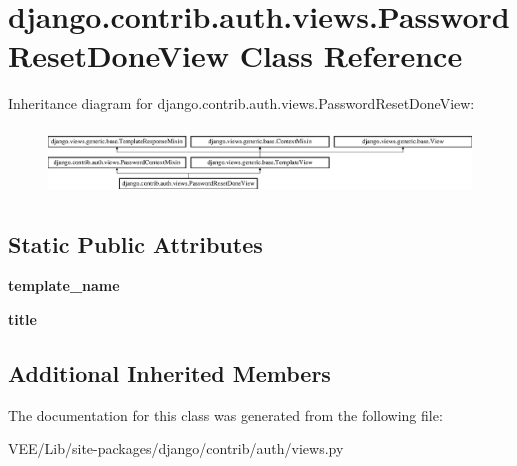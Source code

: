 \hypertarget{classdjango_1_1contrib_1_1auth_1_1views_1_1_password_reset_done_view}{}\section{django.\+contrib.\+auth.\+views.\+Password\+Reset\+Done\+View Class Reference}
\label{classdjango_1_1contrib_1_1auth_1_1views_1_1_password_reset_done_view}
Inheritance diagram for django.\+contrib.\+auth.\+views.\+Password\+Reset\+Done\+View\+:\begin{figure}[H]
\begin{center}
\leavevmode
\includegraphics[height=1.789137cm]{classdjango_1_1contrib_1_1auth_1_1views_1_1_password_reset_done_view}
\end{center}
\end{figure}
\subsection*{Static Public Attributes}
\begin{DoxyCompactItemize}
\item 
\mbox{\label{classdjango_1_1contrib_1_1auth_1_1views_1_1_password_reset_done_view_a618f8aef1158b35aa21ac0595d44d879}} 
{\bfseries template\+\_\+name}
\item 
\mbox{\label{classdjango_1_1contrib_1_1auth_1_1views_1_1_password_reset_done_view_acc421bb08e6f93261b78cb059e7ce6d5}} 
{\bfseries title}
\end{DoxyCompactItemize}
\subsection*{Additional Inherited Members}


The documentation for this class was generated from the following file\+:\begin{DoxyCompactItemize}
\item 
V\+E\+E/\+Lib/site-\/packages/django/contrib/auth/views.\+py\end{DoxyCompactItemize}
